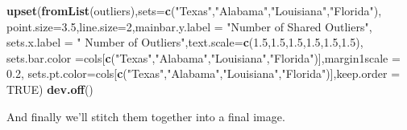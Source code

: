 \documentclass[]{article}
\newenvironment{Shaded}{\begin{snugshade}}{\end{snugshade}}
\newcommand{\KeywordTok}[1]{\textcolor[rgb]{0.13,0.29,0.53}{\textbf{#1}}}
\newcommand{\DataTypeTok}[1]{\textcolor[rgb]{0.13,0.29,0.53}{#1}}
\newcommand{\DecValTok}[1]{\textcolor[rgb]{0.00,0.00,0.81}{#1}}
\newcommand{\FloatTok}[1]{\textcolor[rgb]{0.00,0.00,0.81}{#1}}
\newcommand{\StringTok}[1]{\textcolor[rgb]{0.31,0.60,0.02}{#1}}
\newcommand{\OtherTok}[1]{\textcolor[rgb]{0.56,0.35,0.01}{#1}}
\newcommand{\NormalTok}[1]{#1}
\begin{document}
\begin{Shaded}
\begin{Highlighting}[]
\KeywordTok{upset}\NormalTok{(}\KeywordTok{fromList}\NormalTok{(outliers),}\DataTypeTok{sets=}\KeywordTok{c}\NormalTok{(}\StringTok{"Texas"}\NormalTok{,}\StringTok{"Alabama"}\NormalTok{,}\StringTok{"Louisiana"}\NormalTok{,}\StringTok{"Florida"}\NormalTok{),}
      \DataTypeTok{point.size=}\FloatTok{3.5}\NormalTok{,}\DataTypeTok{line.size=}\DecValTok{2}\NormalTok{,}\DataTypeTok{mainbar.y.label =} \StringTok{"Number of Shared Outliers"}\NormalTok{,}
      \DataTypeTok{sets.x.label =} \StringTok{" Number of Outliers"}\NormalTok{,}\DataTypeTok{text.scale=}\KeywordTok{c}\NormalTok{(}\FloatTok{1.5}\NormalTok{,}\FloatTok{1.5}\NormalTok{,}\FloatTok{1.5}\NormalTok{,}\FloatTok{1.5}\NormalTok{,}\FloatTok{1.5}\NormalTok{,}\FloatTok{1.5}\NormalTok{),}
      \DataTypeTok{sets.bar.color =}\NormalTok{cols[}\KeywordTok{c}\NormalTok{(}\StringTok{"Texas"}\NormalTok{,}\StringTok{"Alabama"}\NormalTok{,}\StringTok{"Louisiana"}\NormalTok{,}\StringTok{"Florida"}\NormalTok{)],}\DataTypeTok{margin1scale =} \FloatTok{0.2}\NormalTok{,}
      \DataTypeTok{sets.pt.color=}\NormalTok{cols[}\KeywordTok{c}\NormalTok{(}\StringTok{"Texas"}\NormalTok{,}\StringTok{"Alabama"}\NormalTok{,}\StringTok{"Louisiana"}\NormalTok{,}\StringTok{"Florida"}\NormalTok{)],}\DataTypeTok{keep.order =} \OtherTok{TRUE}\NormalTok{)}
\KeywordTok{dev.off}\NormalTok{()}
\end{Highlighting}
\end{Shaded}

And finally we'll stitch them together into a final image.
\end{document}
